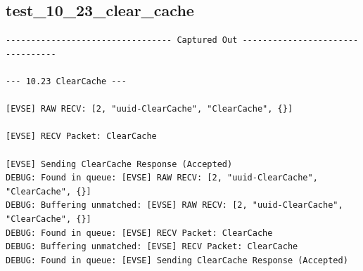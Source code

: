 \documentclass{article}
\begin{document}
\subsection*{test\_10\_23\_clear\_cache}
\begin{lstlisting}
--------------------------------- Captured Out ---------------------------------

--- 10.23 ClearCache ---

[EVSE] RAW RECV: [2, "uuid-ClearCache", "ClearCache", {}]

[EVSE] RECV Packet: ClearCache

[EVSE] Sending ClearCache Response (Accepted)
DEBUG: Found in queue: [EVSE] RAW RECV: [2, "uuid-ClearCache", "ClearCache", {}]
DEBUG: Buffering unmatched: [EVSE] RAW RECV: [2, "uuid-ClearCache", "ClearCache", {}]
DEBUG: Found in queue: [EVSE] RECV Packet: ClearCache
DEBUG: Buffering unmatched: [EVSE] RECV Packet: ClearCache
DEBUG: Found in queue: [EVSE] Sending ClearCache Response (Accepted)
\end{lstlisting}
\end{document}
